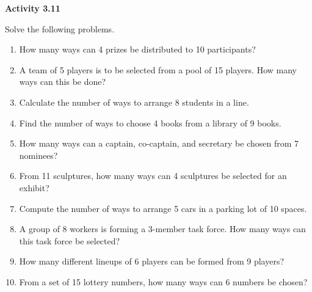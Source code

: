 \vspace{0.3ex}
\noindent\textbf{Activity 3.11}

\vspace{0.2ex}

Solve the following problems. 

\begin{enumerate}[label=\color{blue}\arabic*.]
    \item How many ways can 4 prizes be distributed to 10 participants?
    \item A team of 5 players is to be selected from a pool of 15 players. How many ways can this be done?
    \item Calculate the number of ways to arrange 8 students in a line.
    \item Find the number of ways to choose 4 books from a library of 9 books.
    \item How many ways can a captain, co-captain, and secretary be chosen from 7 nominees?
    \item From 11 sculptures, how many ways can 4 sculptures be selected for an exhibit?
    \item Compute the number of ways to arrange 5 cars in a parking lot of 10 spaces.
    \item A group of 8 workers is forming a 3-member task force. How many ways can this task force be selected?
    \item How many different lineups of 6 players can be formed from 9 players?
    \item From a set of 15 lottery numbers, how many ways can 6 numbers be chosen?
\end{enumerate}

